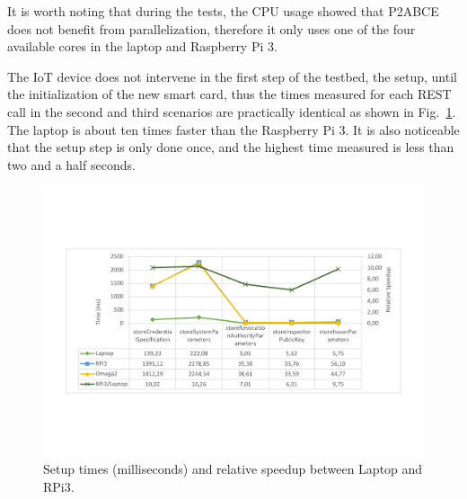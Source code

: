 It is worth noting that during the tests, the CPU usage showed that P2ABCE does not benefit from parallelization, therefore it only uses one of the four available cores in the laptop and Raspberry Pi 3.

\hfil

The IoT device does not intervene in the first step of the testbed, the setup, until the initialization of the new smart card, thus the times measured for each REST call in the second and third scenarios are practically identical as shown in Fig.~\ref{fig:setup:graph}. The laptop is about ten times faster than the Raspberry Pi 3. It is also noticeable that the setup step is only done once, and the highest time measured is less than two and a half seconds.

\begin{figure}[bth]
	\centering
	\includegraphics[width=\linewidth]{gfx/graphics/SetupGraphTable}
	\caption{Setup times (milliseconds) and relative speedup between Laptop and RPi3.}
	\label{fig:setup:graph}
\end{figure}




\hfil

